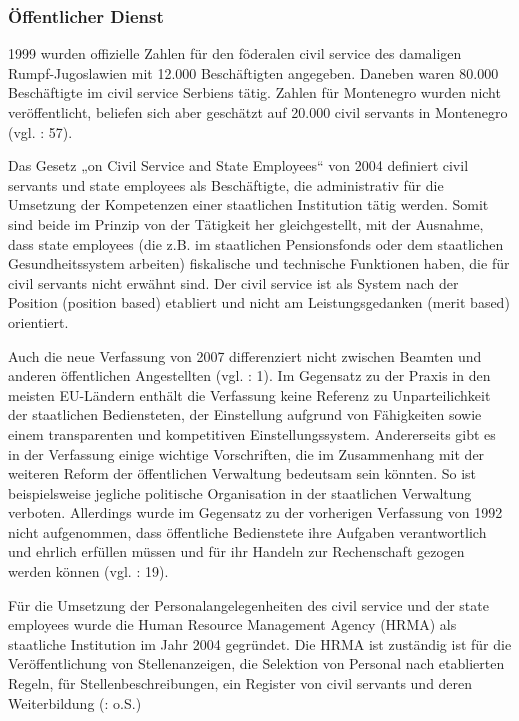 \subsubsection{Öffentlicher Dienst }
1999 wurden offizielle Zahlen für den föderalen civil service des damaligen Rumpf-Jugoslawien mit 12.000 Beschäftigten angegeben. Daneben waren 80.000 Beschäftigte im civil service Serbiens tätig. Zahlen für Montenegro wurden nicht veröffentlicht, beliefen sich aber geschätzt auf 20.000 civil servants in Montenegro (vgl. \cite{sevic}: 57).\par
Das Gesetz „on Civil Service and State Employees“ von 2004 definiert civil servants und state employees als Beschäftigte, die administrativ für die Umsetzung der Kompetenzen einer staatlichen Institution tätig werden. Somit sind beide im Prinzip von der Tätigkeit her gleichgestellt, mit der Ausnahme, dass state employees (die z.B. im staatlichen Pensionsfonds oder dem staatlichen Gesundheitssystem arbeiten) fiskalische und technische Funktionen haben, die für civil servants nicht erwähnt sind. Der civil service ist als System nach der Position (position based) etabliert und nicht am Leistungsgedanken (merit based) orientiert. \par
Auch die neue Verfassung von 2007 differenziert nicht zwischen Beamten und anderen öffentlichen Angestellten (vgl. \cite{oecd08c}: 1). Im Gegensatz zu der Praxis in den meisten EU-Ländern enthält die Verfassung keine Referenz zu Unparteilichkeit der staatlichen Bediensteten, der Einstellung aufgrund von Fähigkeiten sowie einem transparenten und kompetitiven Einstellungssystem. Andererseits gibt es in der Verfassung einige wichtige Vorschriften, die im Zusammenhang mit der weiteren Reform der öffentlichen Verwaltung bedeutsam sein könnten. So ist beispielsweise jegliche politische Organisation in der staatlichen Verwaltung verboten. Allerdings wurde im Gegensatz zu der vorherigen Verfassung von 1992 nicht aufgenommen, dass öffentliche Bedienstete ihre Aufgaben verantwortlich und ehrlich erfüllen müssen und für ihr Handeln zur Rechenschaft gezogen werden können (vgl. \cite{dzamuk}: 19). \par
Für die Umsetzung der Personalangelegenheiten des civil service und der state employees wurde die Human Resource Management Agency (HRMA) als staatliche Institution im Jahr 2004 gegründet. Die HRMA ist zuständig ist für die Veröffentlichung von Stellenanzeigen, die Selektion von Personal nach etablierten Regeln, für Stellenbeschreibungen, ein Register von civil servants und deren Weiterbildung (\cite{vukovic}: o.S.)\par	
